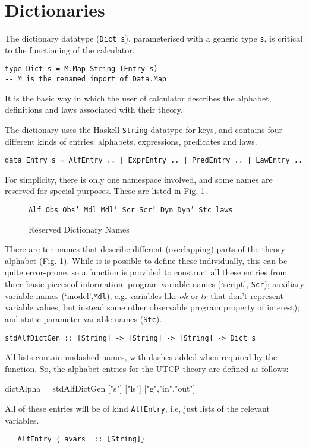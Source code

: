 \section{Dictionaries}\label{sec:Dictionaries}


The dictionary datatype (\texttt{Dict s}),
parameterised with a generic type \texttt{s},
is critical to the functioning of the calculator.
\begin{verbatim}
type Dict s = M.Map String (Entry s)
-- M is the renamed import of Data.Map
\end{verbatim}
It is the basic way in which the user of calculator
describes the alphabet, definitions and laws associated with their theory.

The dictionary uses the Haskell \texttt{String} datatype for keys,
and contains four different kinds of entries: alphabets,
expressions, predicates and laws.
{\small
\begin{verbatim}
data Entry s = AlfEntry .. | ExprEntry .. | PredEntry .. | LawEntry ..
\end{verbatim}
}
For simplicity, there is only one namespace involved,
and some names are reserved for special purposes.
These are listed in Fig. \ref{fig:rsvd-names}.
\begin{figure}[t]
  \centering
\texttt{Alf Obs Obs' Mdl Mdl' Scr Scr' Dyn Dyn' Stc laws}
  \caption{Reserved Dictionary Names}\label{fig:rsvd-names}
\end{figure}

There are ten names that describe different
(overlapping)
parts of the theory alphabet (Fig. \ref{fig:rsvd-names}).
While is is possible to define these individually,
this can be quite error-prone,
so a function is provided to construct all these entries
from three basic pieces of information:
program variable names (`script', \texttt{Scr});
auxiliary variable names (`model',\texttt{Mdl}),
e.g. variables like $ok$ or $tr$ that don't represent variable values,
but instead some other observable program property of interest);
and static parameter variable names (\texttt{Stc}).
\begin{verbatim}
stdAlfDictGen :: [String] -> [String] -> [String] -> Dict s
\end{verbatim}
All lists contain undashed names, with dashes added when required
by the function.
So, the alphabet entries for the UTCP theory are defined as follows:
\begin{code}
dictAlpha = stdAlfDictGen ["s"] ["ls"] ["g","in","out"]
\end{code}
All of these entries will be of kind \texttt{AlfEntry},
i.e, just lists of the relevant variables.
\begin{verbatim}
   AlfEntry { avars  :: [String]}
\end{verbatim}

